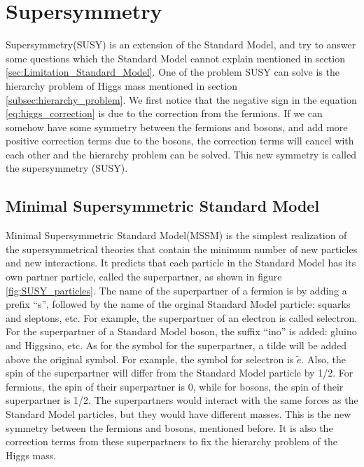 \section{Supersymmetry}
Supersymmetry(SUSY) is an extension of the Standard Model, and try to answer some questions which the Standard Model cannot explain mentioned in section \ref{sec:Limitation_Standard_Model}.
One of the problem SUSY can solve is the hierarchy problem of Higgs mass mentioned in section \ref{subsec:hierarchy_problem}.
We first notice that the negative sign in the equation \ref{eq:higgs_correction} is due to the correction from the fermions.
If we can somehow have some symmetry between the fermions and bosons, and add more positive correction terms due to the bosons, the correction terms will cancel with each other and the hierarchy problem can be solved.
This new symmetry is called the supersymmetry (SUSY).

\subsection{Minimal Supersymmetric Standard Model}
Minimal Supersymmetric Standard Model(MSSM) is the simplest realization of the supersymmetrical theories that contain the minimum number of new particles and new interactions.
It predicts that each particle in the Standard Model has its own partner particle, called the superpartner, as shown in figure \ref{fig:SUSY_particles}.
The name of the superpartner of a fermion is by adding a prefix ``s'', followed by the name of the orginal Standard Model particle: squarks and sleptons, etc.
For example, the superpartner of an electron is called selectron.
For the superpartner of a Standard Model boson, the suffix ``ino'' is added: gluino and Higgsino, etc.
As for the symbol for the superpartner, a tilde will be added above the original symbol.
For example, the symbol for selectron is $\tilde{e}$.
Also, the spin of the superpartner will differ from the Standard Model particle by 1/2.
For fermions, the spin of their superpartner is 0, while for bosons, the spin of their superpartner is 1/2.
The superpartners would interact with the same forces as the Standard Model particles, but they would have different masses.
This is the new symmetry between the fermions and bosons, mentioned before.
It is also the correction terms from these superpartners to fix the hierarchy problem of the Higgs mass.

